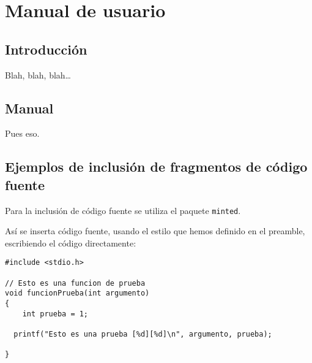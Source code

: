 %
%
%
% 
%
%
%
%


\chapter{Manual de usuario}
\label{cha:manual-de-usuario}

\section{Introducción}
\label{sec:intro-manual-de-usuario}

Blah, blah, blah\ldots


\section{Manual}
\label{sec:sec-manual-de-usuario}

Pues eso.


\section{Ejemplos de inclusión de fragmentos de código fuente}
\label{sec:codigo-fuente}

Para la inclusión de código fuente se utiliza el paquete
\texttt{minted}.

Así se inserta código fuente, usando el estilo que hemos definido en el
preamble, escribiendo el código directamente:

\begin{verbatim}
#include <stdio.h>

// Esto es una funcion de prueba
void funcionPrueba(int argumento)
{	
	int prueba = 1;

  printf("Esto es una prueba [%d][%d]\n", argumento, prueba);

}
\end{verbatim}

